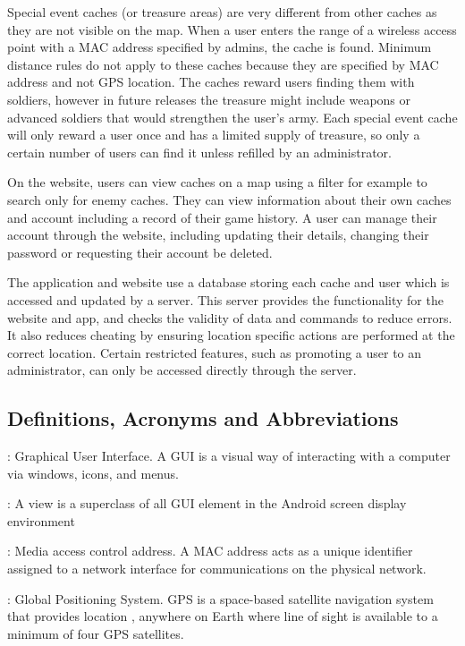Special event caches (or treasure areas) are very different from other caches as they are not visible on the map. When a user enters the range of a wireless access point with a MAC address specified by admins, the cache is found. Minimum distance rules do not apply to these caches because they are specified by MAC address and not GPS location. The caches reward users finding them with soldiers, however in future releases the treasure might include weapons or advanced soldiers that would strengthen the user’s army. Each special event cache will only reward a user once and has a limited supply of treasure, so only a certain number of users can find it unless refilled by an administrator.

On the website, users can view caches on a map using a filter for example to search only for enemy caches. They can view information about their own caches and account including a record of their game history. A user can manage their account through the website, including updating their details, changing their password or requesting their account be deleted.

The application and website use a database storing each cache and user which is accessed and updated by a server. This server provides the functionality for the website and app, and checks the validity of data and commands to reduce errors. It also reduces cheating by ensuring location specific actions are performed at the correct location. Certain restricted features, such as promoting a user to an administrator, can only be accessed directly through the server.

\subsection{Definitions, Acronyms and Abbreviations}
\def\Definition#1#2{\noindent{\bf #1}: #2}

\Definition{GUI}{Graphical User Interface. A GUI is a visual way of interacting with a computer via windows, icons, and menus.}

\Definition{View}{A view is a superclass of all GUI element in the Android screen display environment}

\Definition{MAC Address}{Media access control address. A MAC address acts as a unique identifier assigned to a network interface for communications on the physical network.}

\Definition{GPS}{Global Positioning System. GPS is a space-based satellite navigation system that provides location , anywhere on Earth where line of sight is available to a minimum of four GPS satellites.}

